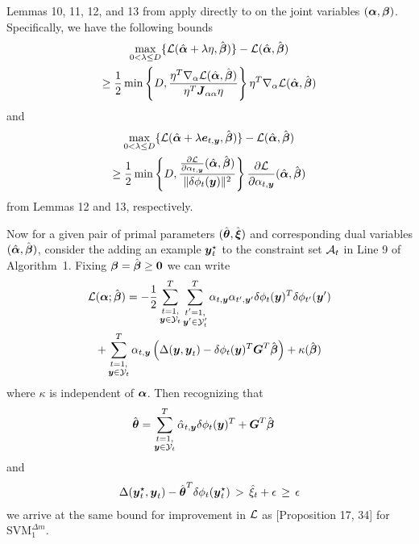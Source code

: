 \documentclass[10pt,journal,letterpaper,compsoc]{IEEEtran}
\renewcommand{\citename}{\citet}
\begin{document}
Lemmas 10, 11, 12, and 13 from \citename{Tsochantaridis:JMLR05} apply
directly to  on the joint variables $(\boldsymbol{\alpha},
\boldsymbol{\beta})$. Specifically, we have the following bounds
%
\begin{multline}
  \max_{0 < \lambda \leq D} \{\Ell(\hat{\balpha} + \lambda \eta, \hat{\bbeta})\} 
  - \Ell(\hat{\balpha}, \hat{\bbeta}) 
  \\
  \geq \frac{1}{2} \min \left\{D, 
  \frac{\eta^T \nabla_{\alpha} \Ell(\hat{\balpha}, \hat{\bbeta})}{\eta^T \bJ_{\alpha\alpha} \eta}
  \right\} \eta^T \nabla_{\alpha} \Ell(\hat{\balpha}, \hat{\bbeta})
\end{multline}
%
and
%
\begin{multline}
  \max_{0 < \lambda \leq D} \{\Ell(\hat{\balpha} + \lambda \be_{t,\by}, \hat{\bbeta})\} 
  - \Ell(\hat{\balpha}, \hat{\bbeta}) 
  \\
  \geq \frac{1}{2} \min \left\{D, 
  \frac{\frac{\partial \Ell}{\partial \alpha_{t,\by}}(\hat{\balpha}, \hat{\bbeta})}{\|\delta \phi_t(\by)\|^2} 
  \right\}
  \frac{\partial \Ell}{\partial \alpha_{t,\by}}(\hat{\balpha}, \hat{\bbeta})
\end{multline}
%
from Lemmas 12 and 13, respectively.


Now for a given pair of primal parameters $(\hat{\boldsymbol{\theta}},
\hat{\boldsymbol{\xi}})$ and corresponding dual variables $(\hat{\boldsymbol{\alpha}},
\hat{\boldsymbol{\beta}})$, consider the adding an example ${\boldsymbol{y}}_t^\star$ to the
constraint set $\A_t$ in Line 9 of Algorithm~1. Fixing $\boldsymbol{\beta} =
\hat{\boldsymbol{\beta}} \geq \textbf{0}$ we can write
%
\begin{multline}
  \Ell(\balpha; \hat{\bbeta}) =
  -\frac{1}{2} \sum_{\substack{t=1,\\\by \in \Y_t}}^{T} \sum_{\substack{t'=1,\\\by' \in \Y_t'}}^{T}
  \alpha_{t, \by} \alpha_{t', \by'} \delta\phi_t(\by)^T \delta\phi_{t'}(\by') \\
  + \sum_{\substack{t=1,\\\by \in \Y_t}}^{T} \alpha_{t, \by} \left(\Delta(\by, \by_t) - \delta\phi_t(\by)^T \bG^T \hat{\bbeta} \right) + \kappa(\hat{\bbeta})
\end{multline}
%
where $\kappa$ is independent of $\boldsymbol{\alpha}$. Then recognizing that
%
\begin{align}
  \hat{\btheta} &= \sum_{\substack{t=1,\\\by \in \Y_t}}^{T} \hat{\alpha}_{t, \by} \delta\phi_t(\by)^T + \bG^T \hat{\bbeta}
\end{align}
%
and
%
\begin{align}
  \Delta({\boldsymbol{y}}^\star_t, {\boldsymbol{y}}_t) - \hat{\boldsymbol{\theta}}^T\delta\phi_t({\boldsymbol{y}}_t^\star)
  \,>\, \hat{\xi}_t + \epsilon \,\geq\, \epsilon
\end{align}
% 
we arrive at the same bound for improvement in $\Ell$ as
[Proposition 17, 34] for $\text{SVM}_1^{\Delta
  m}$.
\end{document}
